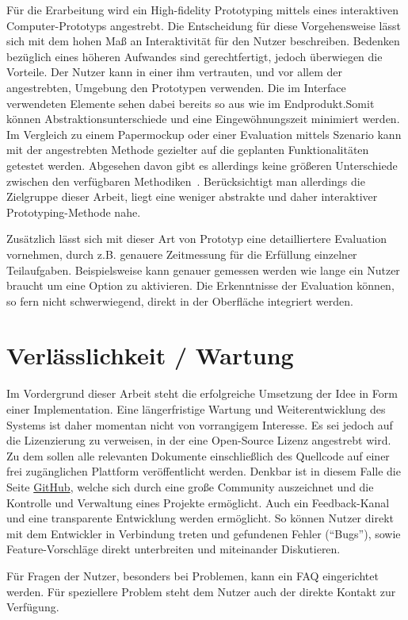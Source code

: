 Für die Erarbeitung wird ein High-fidelity Prototyping mittels eines interaktiven Computer-Prototyps angestrebt. Die Entscheidung für diese Vorgehensweise lässt sich mit dem hohen Maß an Interaktivität für den Nutzer beschreiben. Bedenken bezüglich eines höheren Aufwandes sind gerechtfertigt, jedoch überwiegen die Vorteile. Der Nutzer kann in einer ihm vertrauten, und vor allem der angestrebten, Umgebung den Prototypen verwenden. Die im Interface verwendeten Elemente sehen dabei bereits so aus wie im Endprodukt.Somit können Abstraktionsunterschiede und eine Eingewöhnungszeit minimiert werden. Im Vergleich zu einem Papermockup oder einer Evaluation mittels Szenario kann mit der angestrebten Methode gezielter auf die geplanten Funktionalitäten getestet werden. Abgesehen davon gibt es allerdings keine größeren Unterschiede zwischen den verfügbaren Methodiken~\cite{johansson_case_2007}. Berücksichtigt man allerdings die Zielgruppe dieser Arbeit, liegt eine weniger abstrakte und daher interaktiver Prototyping-Methode nahe. 

Zusätzlich lässt sich mit dieser Art von Prototyp eine detailliertere Evaluation vornehmen, durch z.B. genauere Zeitmessung für die Erfüllung einzelner Teilaufgaben. Beispielsweise kann genauer gemessen werden wie lange ein Nutzer braucht um eine Option zu aktivieren. Die Erkenntnisse der Evaluation können, so fern nicht schwerwiegend, direkt in der Oberfläche integriert werden.
\section{Verlässlichkeit / Wartung}
Im Vordergrund dieser Arbeit steht die erfolgreiche Umsetzung der Idee in Form einer Implementation. Eine längerfristige Wartung und Weiterentwicklung des Systems ist daher momentan nicht von vorrangigem Interesse. Es sei jedoch auf die Lizenzierung zu verweisen, in der eine Open-Source Lizenz angestrebt wird. Zu dem sollen alle relevanten Dokumente einschließlich des Quellcode auf einer frei zugänglichen Plattform veröffentlicht werden.
Denkbar ist in diesem Falle die Seite \href{https://github.com/}{GitHub}, welche sich durch eine große Community auszeichnet und die Kontrolle und Verwaltung eines Projekte ermöglicht. Auch ein Feedback-Kanal und eine transparente Entwicklung werden ermöglicht. So können Nutzer direkt mit dem Entwickler in Verbindung treten und gefundenen Fehler ("`Bugs"'), sowie Feature-Vorschläge direkt unterbreiten und miteinander Diskutieren.

Für Fragen der Nutzer, besonders bei Problemen, kann ein \acrshort{FAQ} eingerichtet werden. Für speziellere Problem steht dem Nutzer auch der direkte Kontakt zur Verfügung.
